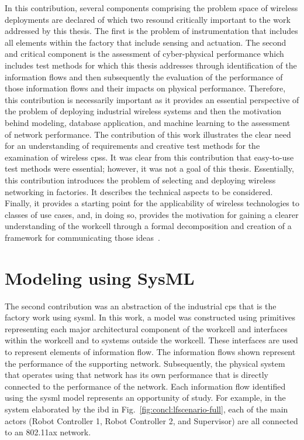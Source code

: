 In this contribution, several components comprising the problem space of wireless deployments are declared of which two resound critically important to the work addressed by this thesis.  The first is the problem of instrumentation that includes all elements within the factory that include sensing and actuation.  The second and critical component is the assessment of cyber-physical performance which includes test methods for which this thesis addresses through identification of the information flows and then subsequently the evaluation of the performance of those information flows and their impacts on physical performance.  Therefore, this contribution is necessarily important as it provides an essential perspective of the problem of deploying industrial wireless systems and then the motivation behind modeling, database application, and machine learning to the assessment of network performance.  The contribution of this work illustrates the clear need for an understanding of requirements and creative test methods for the examination of wireless \glspl{cps}.  It was clear from this contribution that easy-to-use test methods were essential; however, it was not a goal of this thesis.  Essentially, this contribution introduces the problem of selecting and deploying wireless networking in factories.  It describes the technical aspects to be considered.  Finally, it provides a starting point for the applicability of wireless technologies to classes of use cases, and, in doing so, provides the motivation for gaining a clearer understanding of the workcell through a formal decomposition and creation of a framework for communicating those ideas~\cite{CandellISIT2020.Conf}.

\section{Modeling using SysML}
The second contribution was an abstraction of the industrial \gls{cps} that is the factory work using \gls{sysml}.  In this work, a model was constructed using primitives representing each major architectural component of the workcell and interfaces within the workcell and to systems outside the workcell.  These interfaces are used to represent elements of information flow.  The information flows shown represent the performance of the supporting network.  Subsequently, the physical system that operates using that network has its own performance that is directly connected to the performance of the network.  Each information flow identified using the \gls{sysml} model represents an opportunity of study.  For example, in the system elaborated by the \gls{ibd} in Fig.~\ref{fig:concl:lfscenario-full}, each of the main actors (Robot Controller 1, Robot Controller 2, and Supervisor) are all connected to an 802.11ax network.


